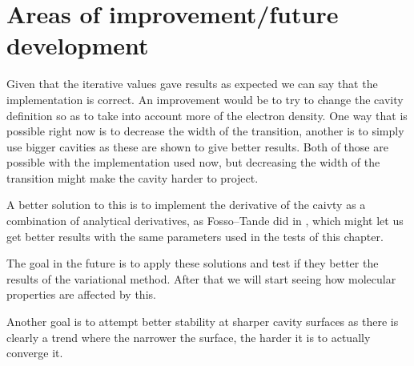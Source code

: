 \documentclass[../master_thesis.tex]{subfiles}
\begin{document}
\section{Areas of improvement/future development}
Given that the iterative values gave results as expected we can say that the
implementation is correct. An improvement would be to try to change the cavity
definition so as to take into account more of the electron density. One way that is
possible right now is to decrease the width of the transition, another is to simply use
bigger cavities as these are shown to give better results. Both of those are possible
with the implementation used now, but decreasing the width of the transition might
make the cavity harder to project.

A better solution to this is to implement the derivative of the caivty as
a combination of analytical derivatives, as Fosso--Tande did in \cite{FossoTande:2013ka}, which
might let us get better results with the same parameters used in the tests of this chapter.

The goal in the future is to apply these solutions and test if they better the
results of the variational method. After that we will start seeing how molecular properties
are affected by this.

Another goal is to attempt better stability at sharper cavity surfaces as there
is clearly a trend where the narrower the surface, the harder it is to actually
converge it.



\biblio
\end{document}
